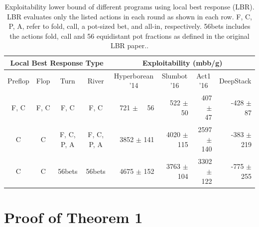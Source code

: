 \begin{table}[h!]
\centering
\caption{Exploitability lower bound of different programs using local best response (LBR). LBR evaluates only the listed actions in each round as shown in each row.  F, C, P, A, refer to fold, call, a pot-sized bet, and all-in, respectively. 56bets includes the actions fold, call and 56 equidistant pot fractions as defined in the original LBR paper.\cite{Lisy16:LocalBR}.}
\label{tab-localbr}
\begin{small}
\begin{tabular}{cccc|rrrr}
\toprule
\multicolumn{4}{c}{Local Best Response Type}                                                                  & \multicolumn{4}{c}{Exploitability (mbb/g)}        \\
\midrule
\multicolumn{1}{c}{Preflop} & \multicolumn{1}{c}{Flop} & \multicolumn{1}{c}{Turn} & \multicolumn{1}{c|}{River} & \multicolumn{1}{c}{Hyperborean '14} & \multicolumn{1}{c}{Slumbot '16} & \multicolumn{1}{c}{Act1 '16} & \multicolumn{1}{c}{\cellcolor[HTML]{C0C0C0}DeepStack} \\ \midrule
F, C                 & F, C               & F, C              & F, C                & 721 $\pm$ ~~56 & 522 $\pm$ ~~50 & 407 $\pm$ ~~47   & \cellcolor[HTML]{C0C0C0}-428 $\pm$ ~~87      \\
C                  & C               & F, C, P, A          & F, C, P, A             & 3852 $\pm$ 141 & 4020 $\pm$ 115 & 2597 $\pm$ 140  & \cellcolor[HTML]{C0C0C0}-383 $\pm$ 219    \\
C                  & C               & 56bets               & 56bets        &  4675 $\pm$ 152 & 3763 $\pm$ 104 & 3302 $\pm$ 122               & \cellcolor[HTML]{C0C0C0}-775 $\pm$ 255 \\
\bottomrule
\end{tabular}
\end{small}
\end{table}

\section*{Proof of Theorem 1}

